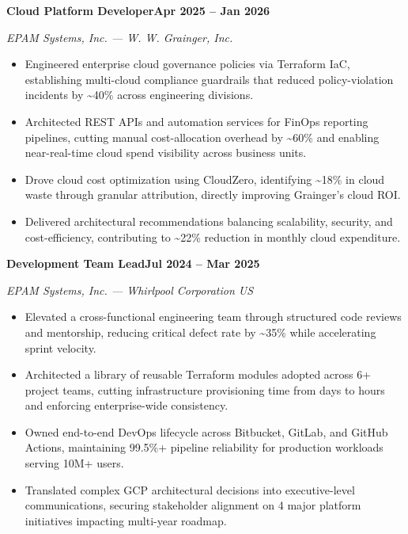 \documentclass[11pt,letterpaper]{article}
\newcommand{\job}[3]{%
  \par\vspace{4pt}%
  \noindent\textbf{#1}\hfill\textbf{#3}%
  \par\vspace{1pt}\noindent\textit{#2}%
  \par\vspace{1pt}%
}
\begin{document}
\job{Cloud Platform Developer}{EPAM Systems, Inc. --- W. W. Grainger, Inc.}{Apr 2025 -- Jan 2026}
\begin{itemize}
    \item Engineered enterprise cloud governance policies via Terraform IaC, establishing multi-cloud compliance guardrails that reduced policy-violation incidents by \textasciitilde{}40\% across engineering divisions.
    \item Architected REST APIs and automation services for FinOps reporting pipelines, cutting manual cost-allocation overhead by \textasciitilde{}60\% and enabling near-real-time cloud spend visibility across business units.
    \item Drove cloud cost optimization using CloudZero, identifying \textasciitilde{}18\% in cloud waste through granular attribution, directly improving Grainger's cloud ROI.
    \item Delivered architectural recommendations balancing scalability, security, and cost-efficiency, contributing to \textasciitilde{}22\% reduction in monthly cloud expenditure.
\end{itemize}

\job{Development Team Lead}{EPAM Systems, Inc. --- Whirlpool Corporation US}{Jul 2024 -- Mar 2025}
\begin{itemize}
    \item Elevated a cross-functional engineering team through structured code reviews and mentorship, reducing critical defect rate by \textasciitilde{}35\% while accelerating sprint velocity.
    \item Architected a library of reusable Terraform modules adopted across 6+ project teams, cutting infrastructure provisioning time from days to hours and enforcing enterprise-wide consistency.
    \item Owned end-to-end DevOps lifecycle across Bitbucket, GitLab, and GitHub Actions, maintaining 99.5\%+ pipeline reliability for production workloads serving 10M+ users.
    \item Translated complex GCP architectural decisions into executive-level communications, securing stakeholder alignment on 4 major platform initiatives impacting multi-year roadmap.
\end{itemize}
\end{document}
